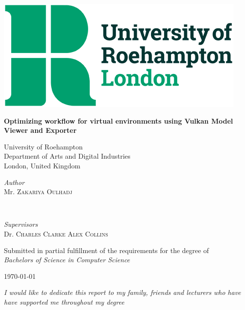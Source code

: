 \documentclass[11pt]{article}
\begin{document}
\begin{titlepage}
	\centering
  \includegraphics[scale=0.35]{images/university-logo.png}\par
  \vspace{1cm}
	{\huge\textbf{Optimizing workflow for virtual environments using Vulkan Model Viewer and Exporter}\par}
  \vspace{1cm}
  University of Roehampton\\
  Department of Arts and Digital Industries\\
  London, United Kingdom
  \vspace{1cm}
  \vfill
  \begin{minipage}[t]{0.4\textwidth}
		\begin{flushleft}
			\large
			\textit{Author}\\
			Mr. \textsc{Zakariya Oulhadj} %
		\end{flushleft}
	\end{minipage}
	~
	\begin{minipage}[t]{0.4\textwidth}
		\begin{flushright}
			\large
			\textit{Supervisors}\\
			Dr. \textsc{Charles Clarke} %
      \textsc{Alex Collins} %
		\end{flushright}
	\end{minipage}

  \vfill
  Submitted in partial fulfillment of the requirements for the degree of \\
  \textit{Bachelors of Science in Computer Science}
  \vfill
	{\large \today\par}
\end{titlepage}

\pagebreak
\pagestyle{empty}


\begin{center}
\thispagestyle{empty}  
\vspace*{\fill}
\textit{I would like to dedicate this report to my family, friends and lecturers who have have supported me throughout my degree}
\vspace*{\fill}
\end{center}
\end{document}
